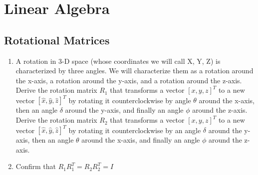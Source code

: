 \section{Linear Algebra}
\subsection{Rotational Matrices}
\begin{enumerate}
\item  A rotation in 3-D space (whose coordinates we will call X, Y, Z) is characterized by three angles. We will characterize them as a rotation around the x-axis, a rotation around the y-axis, and a rotation around the z-axis. \\
Derive the rotation matrix $R_1$ that transforms a vector $[x,y,z]^{T}$  to a new vector $[\hat{x},\hat{y},\hat{z}]^{T}$ by rotating it counterclockwise by angle $\theta$ around the x-axis, then an angle $\delta$ around the y-axis, and finally an angle $\phi$ around the z-axis.\\
Derive the rotation matrix $R_2$ that transforms a vector $[x,y,z]^{T}$  to a new vector $[\hat{x},\hat{y},\hat{z}]^{T}$ by rotating it counterclockwise by an angle $\delta$ around the y-axis, then an angle $\theta$ around the x-axis, and finally an angle $\phi$ around the z-axis.

\item Confirm that $R_1R_1^{T} = R_2R_2^{T} = I$
\end{enumerate}




